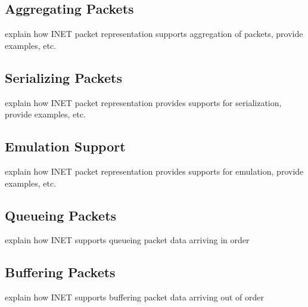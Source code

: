 
\subsection{Aggregating Packets}

explain how INET packet representation supports aggregation of packets, provide examples, etc.



\subsection{Serializing Packets}

explain how INET packet representation provides supports for serialization, provide examples, etc.




\subsection{Emulation Support}

explain how INET packet representation provides supports for emulation, provide examples, etc.



\subsection{Queueing Packets}

explain how INET supports queueing packet data arriving in order



\subsection{Buffering Packets}

explain how INET supports buffering packet data arriving out of order

